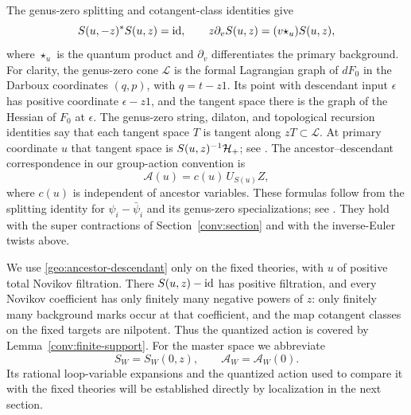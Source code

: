 The genus-zero splitting and cotangent-class identities give
\begin{equation}
 S(u,-z)^*S(u,z)=\operatorname{id},
 \qquad z\partial_v S(u,z)=(v\star_u)S(u,z),
 \label{geo:S-identities}
\end{equation}
where $\star_u$ is the quantum product and $\partial_v$ differentiates
the primary background.  For clarity, the genus-zero cone $\mathcal L$
is the formal Lagrangian graph of $dF_0$ in the Darboux coordinates
$(q,p)$, with $q=t-z1$.  Its point with descendant input $\epsilon$ has
positive coordinate $\epsilon-z1$, and the tangent space there is the
graph of the Hessian of $F_0$ at $\epsilon$.  The genus-zero string,
dilaton, and topological
recursion identities say that each tangent space $T$ is tangent along
$zT\subset\mathcal L$.  At primary coordinate $u$ that tangent space is
$S(u,z)^{-1}\mathcal H_+$; see \cite{GiventalCone}.
The ancestor--descendant correspondence in our group-action convention is
\begin{equation}
                    \mathcal A(u)=c(u)\,U_{S(u)}Z,
                    \label{geo:ancestor-descendant}
\end{equation}
where $c(u)$ is independent of ancestor variables.  These formulas follow
from the splitting identity for $\psi_i-\bar\psi_i$ and its genus-zero
specializations; see \cite{KontsevichManin,Getzler,GiventalQuant}.
They hold with the super contractions of Section~\ref{conv:section} and
with the inverse-Euler twists above.

We use \eqref{geo:ancestor-descendant} only on the fixed theories, with
$u$ of positive total Novikov filtration.  There $S(u,z)-\operatorname{id}$ has positive
filtration, and every Novikov coefficient has only finitely many negative
powers of $z$: only finitely many background marks occur at that
coefficient, and the map cotangent classes on the fixed targets are
nilpotent.  Thus the quantized action is covered by
Lemma~\ref{conv:finite-support}.
For the master space we abbreviate
\[
               S_W=S_W(0,z),\qquad\mathcal A_W=\mathcal A_W(0).
\]
Its rational loop-variable expansions and the quantized action used to
compare it with the fixed theories will be established directly by
localization in the next section.
